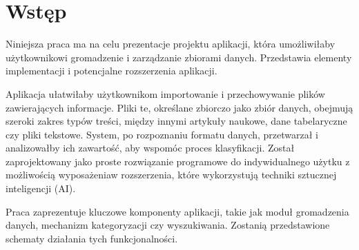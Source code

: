 \documentclass[12pt,a4paper,twoside]{article}
\begin{document}
\section*{Wstęp}
Niniejsza praca ma na celu prezentacje projektu aplikacji, która umożliwiłaby użytkownikowi gromadzenie i zarządzanie zbiorami danych. Przedstawia elementy implementacji i potencjalne rozszerzenia aplikacji.\par
Aplikacja ułatwiłaby użytkownikom importowanie i przechowywanie plików zawierających informacje. Pliki te, określane zbiorczo jako zbiór danych, obejmują szeroki zakres typów treści, między innymi artykuły naukowe, dane tabelaryczne czy pliki tekstowe. System, po rozpoznaniu formatu danych, przetwarzał i analizowałby ich zawartość, aby wspomóc proces klasyfikacji. 
Został zaprojektowany jako proste rozwiązanie programowe do indywidualnego użytku z możliwością wyposażenia\break w rozszerzenia, które wykorzystują techniki sztucznej inteligencji (AI). \par
Praca zaprezentuje kluczowe komponenty aplikacji, takie jak moduł gromadzenia danych, mechanizm kategoryzacji czy wyszukiwania. Zostanią przedstawione schematy działania tych funkcjonalności. 
\newpage
\end{document}
